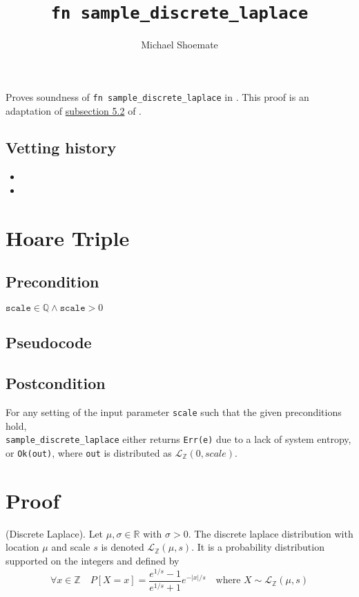 \documentclass{article}
\title{\texttt{fn sample\_discrete\_laplace}}
\author{Michael Shoemate}
\begin{document}
\maketitle

\contrib
Proves soundness of \texttt{fn sample\_discrete\_laplace} in .
This proof is an adaptation of \href{https://arxiv.org/pdf/2004.00010.pdf#subsection.5.2}{subsection 5.2} of \cite{CKS20}.

\subsection*{Vetting history}
\begin{itemize}
    \item {}
    \item {}
\end{itemize}

\section{Hoare Triple}
\subsection*{Precondition}
$\texttt{scale} \in \mathbb{Q} \land \texttt{scale} > 0$

\subsection*{Pseudocode}        


\subsection*{Postcondition}
\label{postcondition}
For any setting of the input parameter \texttt{scale} such that the given preconditions hold, \\
\texttt{sample\_discrete\_laplace} either returns \texttt{Err(e)} due to a lack of system entropy,
or \texttt{Ok(out)}, where \texttt{out} is distributed as $\mathcal{L}_\mathbb{Z}(0, scale)$.

\section{Proof}
\begin{definition} \cite{BV17}
    (Discrete Laplace). Let $\mu, \sigma \in \mathbb{R}$ with $\sigma > 0$. 
    The discrete laplace distribution with location $\mu$ and scale $s$ is denoted $\mathcal{L}_\mathbb{Z}(\mu, s)$. 
    It is a probability distribution supported on the integers and defined by
    \begin{equation*}
        \forall x \in \mathbb{Z} \quad  P[X = x] = \frac{e^{1/s} - 1}{e^{1/s} + 1} e^{-|x|/s} \quad \text{where } X \sim \mathcal{L}_\mathbb{Z}(\mu, s)
    \end{equation*}
\end{definition}
\end{document}
